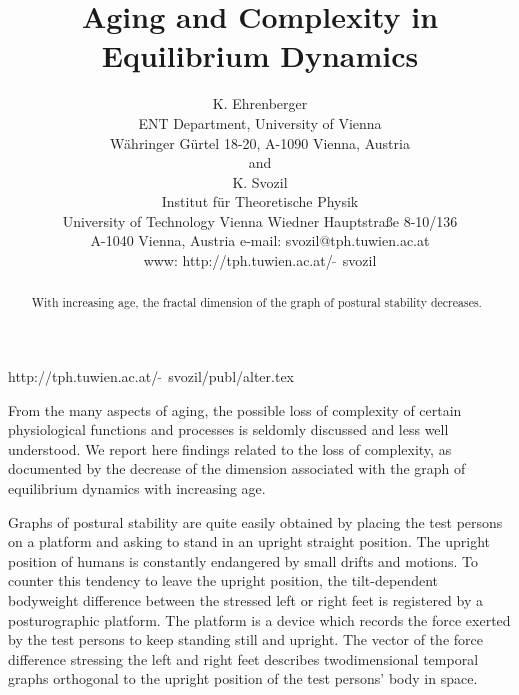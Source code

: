 \renewcommand{\baselinestretch}{2}

\title{Aging and Complexity in Equilibrium Dynamics}
\author{
K. Ehrenberger \\
{\small ENT Department,
University of Vienna}\\
{\small W\"ahringer G\"urtel 18-20,
A-1090 Vienna, Austria}\\
{\small and}\\
K. Svozil\\
 {\small Institut f\"ur Theoretische Physik}  \\
  {\small University of Technology Vienna }
  {\small Wiedner Hauptstra\ss e 8-10/136}    \\
  {\small A-1040 Vienna, Austria   }
  {\small e-mail: svozil@tph.tuwien.ac.at}\\
  {\small www: http://tph.tuwien.ac.at/$\widetilde{\;\;}\,$svozil}}
\date{ }
\maketitle

\begin{flushright}
{\scriptsize
http://tph.tuwien.ac.at/$\widetilde{\;\;}\,$svozil/publ/alter.tex}
\end{flushright}

\begin{abstract}
With increasing age, the fractal dimension of the graph of
postural
stability
decreases.
\end{abstract}

From the many aspects of aging, the possible loss of complexity of
certain physiological functions and processes is seldomly discussed
\cite{lip-gold,lip-mie-mo-gol} and less well understood. We report here
findings related to the loss of complexity, as documented by the
decrease of the dimension associated with the graph of equilibrium
dynamics with increasing age.



Graphs of
postural
stability
 are quite easily obtained by placing the test persons on
a platform and asking to stand
in an upright straight position.
The upright position of humans is constantly endangered by small drifts
and motions. To counter this tendency to leave the upright position,
the tilt-dependent bodyweight difference between the stressed left or
right feet is registered by a posturographic platform.
The platform is a device which records the force exerted by
the test persons  to
keep standing still and upright. The vector of the force difference
stressing the left and right feet
describes twodimensional temporal graphs orthogonal to
the upright position of the test persons' body in space.


